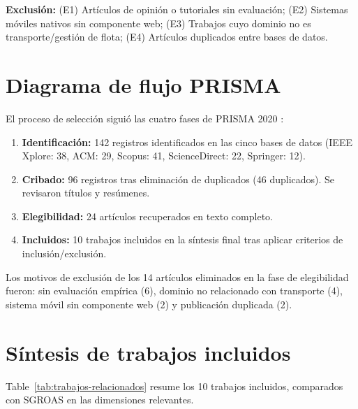 \textbf{Exclusión:} (E1) Artículos de opinión o tutoriales sin evaluación; (E2) Sistemas móviles nativos sin componente web; (E3) Trabajos cuyo dominio no es transporte/gestión de flota; (E4) Artículos duplicados entre bases de datos.

\section{Diagrama de flujo PRISMA}
\label{sec:prisma}

El proceso de selección siguió las cuatro fases de PRISMA 2020 \cite{prisma2021}:

\begin{enumerate}
  \item \textbf{Identificación:} 142 registros identificados en las cinco bases de datos (IEEE Xplore: 38, ACM: 29, Scopus: 41, ScienceDirect: 22, Springer: 12).
  \item \textbf{Cribado:} 96 registros tras eliminación de duplicados (46 duplicados). Se revisaron títulos y resúmenes.
  \item \textbf{Elegibilidad:} 24 artículos recuperados en texto completo.
  \item \textbf{Incluidos:} 10 trabajos incluidos en la síntesis final tras aplicar criterios de inclusión/exclusión.
\end{enumerate}

Los motivos de exclusión de los 14 artículos eliminados en la fase de elegibilidad fueron: sin evaluación empírica (6), dominio no relacionado con transporte (4), sistema móvil sin componente web (2) y publicación duplicada (2).

\section{Síntesis de trabajos incluidos}
\label{sec:sintesis-trabajos}

Table~\ref{tab:trabajos-relacionados} resume los 10 trabajos incluidos, comparados con SGROAS en las dimensiones relevantes.

